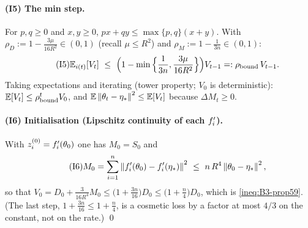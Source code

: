 \paragraph{(I5) The min step.} For $p,q\ge0$ and $x,y\ge0$, $px+qy\le\max\{p,q\}(x+y)$. With $\rho_D:=1-\frac{3\mu}{16R^2}\in(0,1)$ (recall $\mu\le R^2$) and $\rho_M:=1-\frac1{3n}\in(0,1)$:
\begin{equation}\label{ineq:B3-I5}\tag{I5}
\Ei[V_t]\ \le\ \Big(1-\min\Big\{\frac1{3n},\frac{3\mu}{16R^2}\Big\}\Big)V_{t-1}=:\rho_{\mathrm{bound}}\,V_{t-1}.
\end{equation}
Taking expectations and iterating (tower property; $V_0$ is deterministic): $\mathbb{E}[V_t]\le\rho_{\mathrm{bound}}^t V_0$, and $\mathbb{E}\left\|\theta_t-\eta_\ast\right\|^2\le\mathbb{E}[V_t]$ because $\Delta M_t\ge0$.

\paragraph{(I6) Initialisation (Lipschitz continuity of each $f'_i$).} With $z^{(0)}_i=f'_i(\theta_0)$ one has $M_0=S_0$ and
\begin{equation}\label{ineq:B3-I6}\tag{I6}
M_0=\sum_{i=1}^n\norm{\fip(\theta_0)-\fip(\etastar)}^2\ \le\ n\,R^4\norm{\theta_0-\etastar}^2,
\end{equation}
so that $V_0=D_0+\frac{3}{16R^4}M_0\le\big(1+\frac{3n}{16}\big)D_0\le\big(1+\frac n4\big)D_0$, which is \eqref{ineq:B3-prop59}. (The last step, $1+\frac{3n}{16}\le1+\frac n4$, is a cosmetic loss by a factor at most $4/3$ on the constant, not on the rate.) \qed


